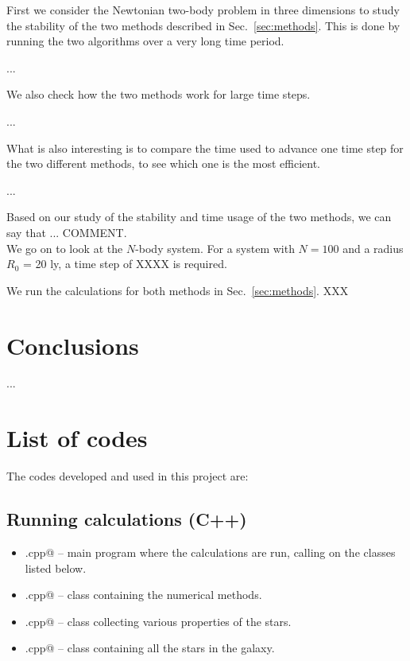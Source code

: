 \documentclass{article}
\begin{document}
\begin{multicols}{2}
First we consider the Newtonian two-body problem in three dimensions to study the stability of the two methods described in Sec.~\ref{sec:methods}. This is done by running the two algorithms over a very long time period. 

...

We also check how the two methods work for large time steps.

...

What is also interesting is to compare the time used to advance one time step for the two different methods, to see which one is the most efficient.

...

Based on our study of the stability and time usage of the two methods, we can say that ... COMMENT. \\


\noindent We go on to look at the $N$-body system. For a system with $N = 100$ and a radius $R_0$ = 20 ly, a time step of XXXX is required.

We run the calculations for both methods in Sec.~\ref{sec:methods}. XXX





\section{Conclusions}

...




\section{List of codes}

The codes developed and used in this project are: 


\subsection{Running calculations (C++)}

\begin{itemize}
	\item \verb@main.cpp@ -- main program where the calculations are run, calling on the classes listed below. 
	\item \verb@solver.cpp@ -- class containing the numerical methods.
	\item \verb@star.cpp@ -- class collecting various properties of the stars.
	\item \verb@galaxy.cpp@ -- class containing all the stars in the galaxy.
\end{itemize}



\end{multicols}
\end{document}
